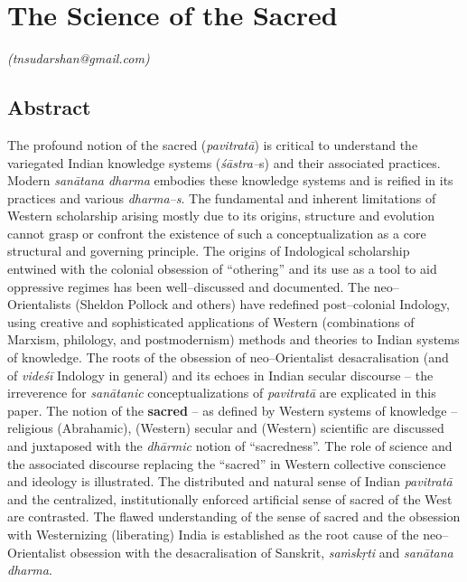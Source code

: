 
\chapter{The Science of the Sacred}\label{chapter5}


\begin{flushright}
\textit{(tnsudarshan@gmail.com)}
\end{flushright}


\section*{Abstract}

The profound notion of the sacred (\textit{pavitratā}) is critical to understand the variegated Indian knowledge systems (\textit{śāstra–}s) and their associated practices. Modern \textit{sanātana dharma} embodies these knowledge systems and is reified in its practices and various \textit{dharma–s}. The fundamental and inherent limitations of Western scholarship arising mostly due to its origins, structure and evolution cannot grasp or confront the existence of such a conceptualization as a core structural and governing principle. The origins of Indological scholarship entwined with the colonial obsession of “othering” and its use as a tool to aid oppressive regimes has been well–discussed and documented. The neo–Orientalists (Sheldon Pollock and others) have redefined post–colonial Indology, using creative and sophisticated applications of Western (combinations of Marxism, philology, and postmodernism) methods and theories to Indian systems of knowledge. The roots of the obsession of neo–Orientalist desacralisation (and of \textit{videśī} Indology in general) and its echoes in Indian secular discourse – the irreverence for \textit{sanātanic} conceptualizations of \textit{pavitratā} are explicated in this paper. The notion of the \textbf{sacred} – as defined by Western systems of knowledge – religious (Abrahamic), (Western) secular and (Western) scientific are discussed and juxtaposed with the \textit{dhārmic} notion of “sacredness”. The role of science and the associated discourse replacing the “sacred” in Western collective conscience and ideology is illustrated. The distributed and natural sense of Indian \textit{pavitratā} and the centralized, institutionally enforced artificial sense of sacred of the West are contrasted. The flawed understanding of the sense of sacred and the obsession with Westernizing (liberating) India is established as the root cause of the neo–Orientalist obsession with the desacralisation of Sanskrit, \textit{saṁskṛti} and \textit{sanātana dharma}.


